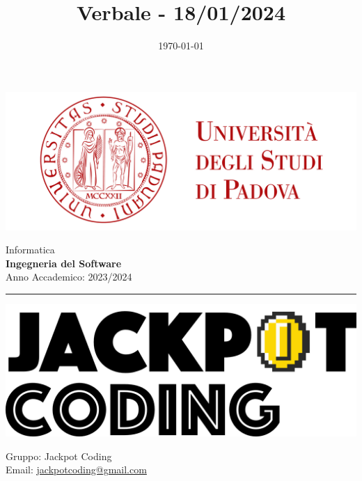 \documentclass[5pt]{article}
\title{ Verbale - 18/01/2024 }
\date{\today}
\begin{document}
	
	
	
	\vspace{8pt}
	\includegraphics[scale=0.2]{UNIPDFull.png}
	
	\vspace{10pt}
	
	\begin{minipage}[t]{0.48\textwidth}
		\begin{flushleft}
			Informatica\\
			\vspace{5pt}
			\textbf{\LARGE Ingegneria del Software}\\
			Anno Accademico: 2023/2024
		\end{flushleft}
	\end{minipage}
	
	
	\vspace{5px}
	
	
	\rule{\textwidth}{5pt}
	
	\begin{minipage}[t]{0.50\textwidth}
		\begin{flushleft}
			\hspace{10pt}
			\includegraphics[scale=0.65]{jackpot-logo.png} 
		\end{flushleft}
	\end{minipage}
	\hspace{-60pt} %
	\begin{flushright}
		\begin{minipage}[t]{0.50\textwidth}
			\begin{flushright}
				Gruppo: {\Large Jackpot Coding}\\
				Email: \href{mailto:jackpotcoding@gmail.com}{jackpotcoding@gmail.com}
			\end{flushright}
		\end{minipage}
	\end{flushright}
	
\end{document}
